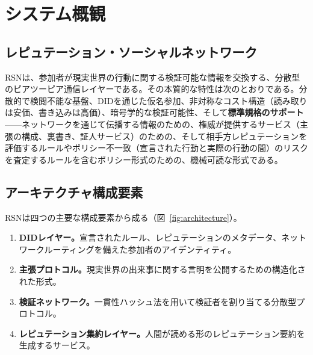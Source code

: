\documentclass[11pt,a4paper,twocolumn]{article}
\begin{document}
\section{システム概観}

\subsection{レピュテーション・ソーシャルネットワーク}

RSNは、参加者が現実世界の行動に関する検証可能な情報を交換する、分散型のピアツーピア通信レイヤーである。その本質的な特性は次のとおりである。分散的で検閲不能な基盤、DIDを通じた仮名参加、非対称なコスト構造（読み取りは安価、書き込みは高価）、暗号学的な検証可能性、そして\textbf{標準規格のサポート}——ネットワークを通じて伝播する情報のための、権威が提供するサービス（主張の構成、裏書き、証人サービス）のための、そして相手方レピュテーションを評価するルールやポリシー不一致（宣言された行動と実際の行動の間）のリスクを査定するルールを含むポリシー形式のための、機械可読な形式である。

\subsection{アーキテクチャ構成要素}

RSNは四つの主要な構成要素から成る（図~\ref{fig:architecture}）。
\begin{enumerate}[nosep]
\item \textbf{DIDレイヤー。}宣言されたルール、レピュテーションのメタデータ、ネットワークルーティングを備えた参加者のアイデンティティ。
\item \textbf{主張プロトコル。}現実世界の出来事に関する言明を公開するための構造化された形式。
\item \textbf{検証ネットワーク。}一貫性ハッシュ法を用いて検証者を割り当てる分散型プロトコル。
\item \textbf{レピュテーション集約レイヤー。}人間が読める形のレピュテーション要約を生成するサービス。
\end{enumerate}
\end{document}
